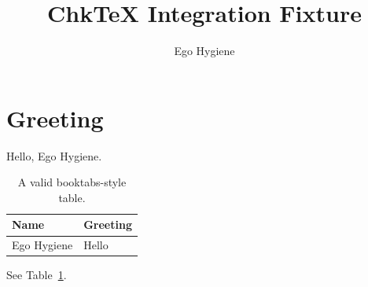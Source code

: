 \documentclass{article}
\title{ChkTeX Integration Fixture}
\author{Ego Hygiene}
\begin{document}
\maketitle

\section{Greeting}

Hello, Ego Hygiene.

\begin{table}[ht]
  \centering
  \begin{tabular}{ll}
    \toprule
    Name & Greeting \\
    \midrule
    Ego Hygiene & Hello \\
    \bottomrule
  \end{tabular}
  \caption{A valid booktabs-style table.}
  \label{tab:greeting}
\end{table}

See Table~\ref{tab:greeting}.
\end{document}
